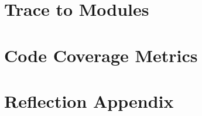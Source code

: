 \documentclass[12pt, titlepage]{article}
\begin{document}
\section{Trace to Modules}		

\section{Code Coverage Metrics}

\appendix
\section{Reflection Appendix}




\nocite{*}
\end{document}
